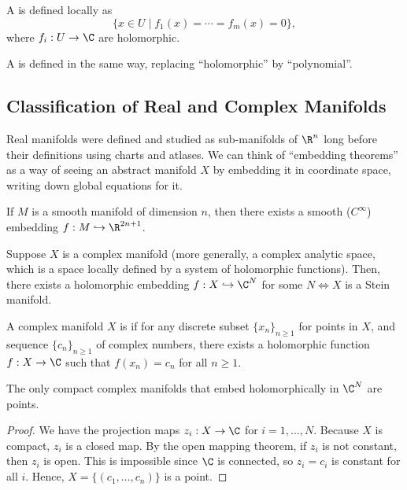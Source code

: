 \documentclass[11pt]{report}
\begin{document}
\begin{defn}
    A  is defined locally as 
    $$\{x \in U \mid f_1(x) =\cdots = f_m(x) =0\},$$ 
    where $f_i: U \to \C$ are holomorphic.

    A  is defined in the same way, replacing ``holomorphic'' by ``polynomial''.
\end{defn}

\subsection{Classification of Real and Complex Manifolds}

Real manifolds were defined and studied as sub-manifolds of $\R^n$ long before their definitions using charts and atlases. We can think of ``embedding theorems'' as a way of seeing an abstract manifold $X$ by embedding it in coordinate space, writing down global equations for it.

\begin{thm}
    If $M$ is a smooth manifold of dimension $n$, then there exists a smooth ($C^\infty$) embedding $f: M \hookrightarrow \R^{2n+1}$.
\end{thm}

Suppose $X$ is a complex manifold (more generally, a complex analytic space, which is a space locally defined by a system of holomorphic functions). Then, there exists a holomorphic embedding $f:X \hookrightarrow \C^N$ for some $N \iff X$ is a Stein manifold.

\begin{defn}
    A complex manifold $X$ is  if for any discrete subset $\{x_n\}_{n \geq 1}$ for points in $X$, and sequence $\{c_n\}_{n\geq1}$ of complex numbers, there exists a holomorphic function $f:X \to \C$ such that $f(x_n) =c_n$ for all $n \geq 1$.
\end{defn}

\begin{thm}
    The only compact complex manifolds that embed holomorphically in $\C^N$ are points.
\end{thm}

\begin{proof}
    We have the projection maps $z_i:X \to \C$ for $i=1,\dots,N$. Because $X$ is compact, $z_i$ is a closed map. By the open mapping theorem, if $z_i$ is not constant, then $z_i$ is open. This is impossible since $\C$ is connected, so $z_i=c_i$ is constant for all $i$. Hence, $X=\{(c_1,\dots,c_n)\}$ is a point.
\end{proof}
\end{document}
